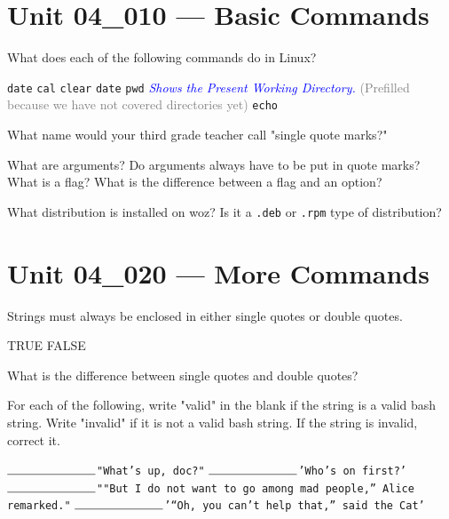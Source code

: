 \documentclass[letterpaper,12pt]{exam}
\newcommand{\unit}{Unit 04}
\begin{document}
\begin {questions}

\section*{\unit\_010 --- Basic Commands} %

\begin{samepage}
	\question What does each of the following commands do in Linux?
	\begin{checkboxes}
		\choice \texttt{{\huge date}}
		\choice \texttt{{\huge cal}}
		\choice \texttt{{\huge clear}}
		\choice \texttt{{\huge date}}
		\choice \texttt{{\huge pwd}} \textcolor{blue}{\textsl{Shows the Present Working Directory.}} \textcolor{gray}{(Prefilled because we have not covered directories yet)}
		\choice \texttt{{\huge echo}}
	\end{checkboxes}
	\end{samepage}

\question What name would your third grade teacher call "single quote marks?" 
\vspace{1.25cm}

\question What are arguments?  Do arguments always have to be put in quote marks? 
\vspace{1.25cm}
\question What is a flag?  What is the difference between a flag and an option? 

\question What distribution is installed on woz?  Is it a \texttt{.deb} or \texttt{.rpm} type of distribution? 

\section*{\unit\_020 --- More Commands} %

\begin{samepage}
\question Strings must always be enclosed in either single quotes or double quotes.
\begin{checkboxes}
\choice TRUE
\choice FALSE
\end{checkboxes}
\end{samepage}

\question What is the difference between single quotes and double quotes? 
\vspace{1.25cm}

\begin{samepage}
\question For each of the following, write "valid" in the blank if the string is a valid bash string. Write "invalid" if it is not a valid bash string. If the string is invalid, correct it.
\begin{checkboxes}
	\choice $\rule{2.5cm}{0.15mm}$\texttt{\Large "What's up, doc?"}
	\choice $\rule{2.5cm}{0.15mm}$\texttt{\Large 'Who's on first?'}
	\choice $\rule{2.5cm}{0.15mm}$\texttt{\Large ""But I do not want to go among mad people,” Alice remarked."}
	\choice $\rule{2.5cm}{0.15mm}$\texttt{\Large '“Oh, you can’t help that,” said the Cat'}


\end{checkboxes}
\end{samepage}
\end{questions}
\end{document}
